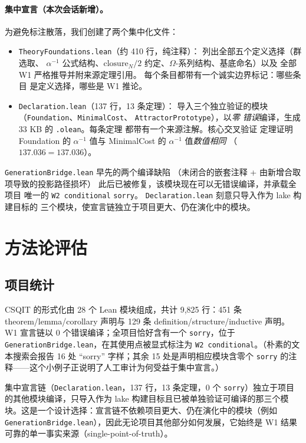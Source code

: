 \documentclass[11pt]{ctexart}
\begin{document}
\paragraph{集中宣言（本次会话新增）。}
为避免标注散落，我们创建了两个集中化文件：
\begin{itemize}
\item \texttt{TheoryFoundations.lean}（约 410 行，纯注释）：
  列出全部五个定义选择（群选取、
  $\alpha^{-1}$ 公式结构、$\mathrm{closure}_N/2$
  约定、$\Omega$-系列结构、基底命名）以及
  全部 W1 严格推导并附来源定理引用。
  每个条目都带有一个诚实边界标记：哪些条目
  是定义选择，哪些是 W1 推论。
\item \texttt{Declaration.lean}（137 行，13 条定理）：
  导入三个独立验证的模块
  （\texttt{Foundation}、\texttt{MinimalCost}、
  \texttt{AttractorPrototype}），以\emph{零
  错误}编译，生成 33 KB 的 \texttt{.olean}。每条定理
  都带有一个来源注解。核心交叉验证
  定理证明 Foundation 的 $\alpha^{-1}$ 值与
  MinimalCost 的 $\alpha^{-1}$ 值\emph{数值相同}
  （$137.036 = 137.036$）。
\end{itemize}
\texttt{GenerationBridge.lean} 早先的两个编译缺陷
（未闭合的嵌套注释 + 由新增合取项导致的投影路径损坏）
此后已被修复，该模块现在可以无错误编译，并承载全项目
唯一的 \texttt{W2 conditional} \texttt{sorry}。
\texttt{Declaration.lean} 刻意只导入作为 lake 构建目标的
三个模块，使宣言链独立于项目更大、仍在演化中的模块。

\section{方法论评估}
\label{sec:evaluation}

\subsection{项目统计}
CSQIT 的形式化由 28 个 Lean 模块组成，共计 9,825 行：451 条 theorem/lemma/corollary 声明与 129 条 definition/structure/inductive 声明。W1 宣言链以 0 个错误编译；全项目恰好含有一个 \texttt{sorry}，位于 \texttt{GenerationBridge.lean}，在其使用点被显式标注为 \texttt{W2 conditional}。（朴素的文本搜索会报告 16 处 “sorry” 字样；其余 15 处是声明相应模块含零个 \texttt{sorry} 的注释——这个小例子正说明了人工审计为何受益于集中宣言。）

集中宣言链（\texttt{Declaration.lean}，137 行，13 条定理，0 个 \texttt{sorry}）独立于项目的其他模块编译，只导入作为 lake 构建目标且已被单独验证可编译的那三个模块。这是一个设计选择：宣言链不依赖项目更大、仍在演化中的模块（例如 \texttt{GenerationBridge.lean}），因此无论项目其他部分如何发展，它始终是 W1 结果可靠的单一事实来源（single-point-of-truth）。
\end{document}
